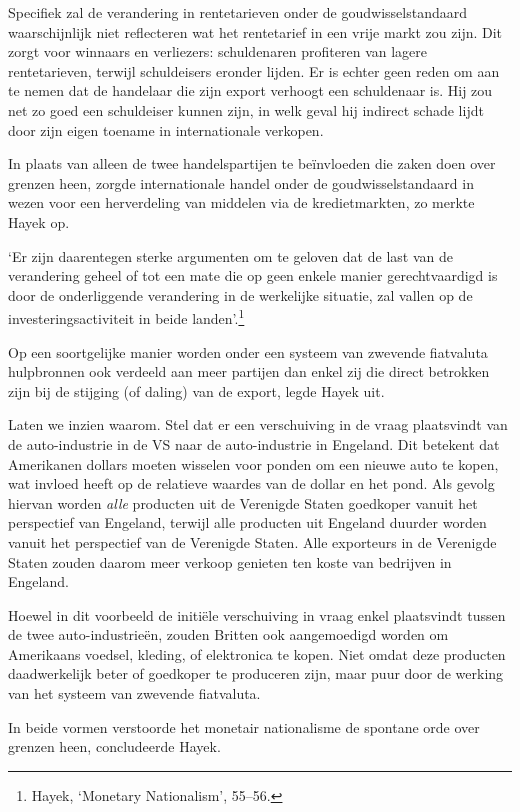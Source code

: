 \documentclass[
  a5paper,
  smalldemyvopaper,11pt,twoside,onecolumn,openright,extrafontsizes]{memoir}
\begin{document}
Specifiek zal de verandering in rentetarieven onder de
goudwisselstandaard waarschijnlijk niet reflecteren wat het rentetarief
in een vrije markt zou zijn. Dit zorgt voor winnaars en verliezers:
schuldenaren profiteren van lagere rentetarieven, terwijl schuldeisers
eronder lijden. Er is echter geen reden om aan te nemen dat de handelaar
die zijn export verhoogt een schuldenaar is. Hij zou net zo goed een
schuldeiser kunnen zijn, in welk geval hij indirect schade lijdt door
zijn eigen toename in internationale verkopen.

In plaats van alleen de twee handelspartijen te beïnvloeden die zaken
doen over grenzen heen, zorgde internationale handel onder de
goudwisselstandaard in wezen voor een herverdeling van middelen via de
kredietmarkten, zo merkte Hayek op.

`Er zijn daarentegen sterke argumenten om te geloven dat de last van de
verandering geheel of tot een mate die op geen enkele manier
gerechtvaardigd is door de onderliggende verandering in de werkelijke
situatie, zal vallen op de investeringsactiviteit in beide
landen'.\footnote{\hspace{0pt}Hayek, `Monetary Nationalism', 55--56.}

Op een soortgelijke manier worden onder een systeem van zwevende
fiatvaluta hulpbronnen ook verdeeld aan meer partijen dan enkel zij die
direct betrokken zijn bij de stijging (of daling) van de export, legde
Hayek uit.

Laten we inzien waarom. Stel dat er een verschuiving in de vraag
plaatsvindt van de auto-industrie in de VS naar de auto-industrie in
Engeland. Dit betekent dat Amerikanen dollars moeten wisselen voor
ponden om een nieuwe auto te kopen, wat invloed heeft op de relatieve
waardes van de dollar en het pond. Als gevolg hiervan worden \emph{alle}
producten uit de Verenigde Staten goedkoper vanuit het perspectief van
Engeland, terwijl alle producten uit Engeland duurder worden vanuit het
perspectief van de Verenigde Staten. Alle exporteurs in de Verenigde
Staten zouden daarom meer verkoop genieten ten koste van bedrijven in
Engeland.

Hoewel in dit voorbeeld de initiële verschuiving in vraag enkel
plaatsvindt tussen de twee auto-industrieën, zouden Britten ook
aangemoedigd worden om Amerikaans voedsel, kleding, of elektronica te
kopen. Niet omdat deze producten daadwerkelijk beter of goedkoper te
produceren zijn, maar puur door de werking van het systeem van zwevende
fiatvaluta.

In beide vormen verstoorde het monetair nationalisme de spontane orde
over grenzen heen, concludeerde Hayek.
\end{document}
